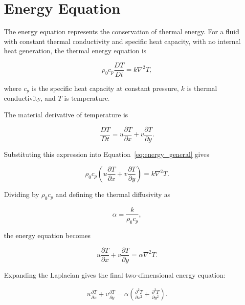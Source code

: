 \documentclass[preprint,3p,number]{elsarticle}
\begin{document}
\section{Energy Equation}

The energy equation represents the conservation of thermal
energy. For a fluid with constant thermal conductivity and
specific heat capacity, with no internal heat generation,
the thermal energy equation is

\begin{equation}
\rho_0c_p\frac{DT}{Dt}
=k\nabla^2T,
\label{eq:energy_general}
\end{equation}

where $c_p$ is the specific heat capacity at constant
pressure, $k$ is thermal conductivity, and $T$ is temperature.

The material derivative of temperature is

\begin{equation}
\frac{DT}{Dt}
=u\frac{\partial T}{\partial x}
+v\frac{\partial T}{\partial y}.
\end{equation}

Substituting this expression into
Equation~\eqref{eq:energy_general} gives

\begin{equation}
\rho_0c_p\left(
u\frac{\partial T}{\partial x}
+v\frac{\partial T}{\partial y}
\right)
=k\nabla^2T.
\end{equation}

Dividing by $\rho_0c_p$ and defining the thermal
diffusivity as

\begin{equation}
\alpha=\frac{k}{\rho_0c_p},
\end{equation}

the energy equation becomes

\begin{equation}
u\frac{\partial T}{\partial x}
+v\frac{\partial T}{\partial y}
=\alpha\nabla^2T.
\end{equation}

Expanding the Laplacian gives the final two-dimensional
energy equation: 

\begin{equation}
\boxed{
\begin{aligned}
u\frac{\partial T}{\partial x}
+v\frac{\partial T}{\partial y}
=\alpha\left(
\frac{\partial^2T}{\partial x^2}
+\frac{\partial^2T}{\partial y^2}
\right).
\end{aligned}
}
\label{eq:energy}
\end{equation}
\end{document}
